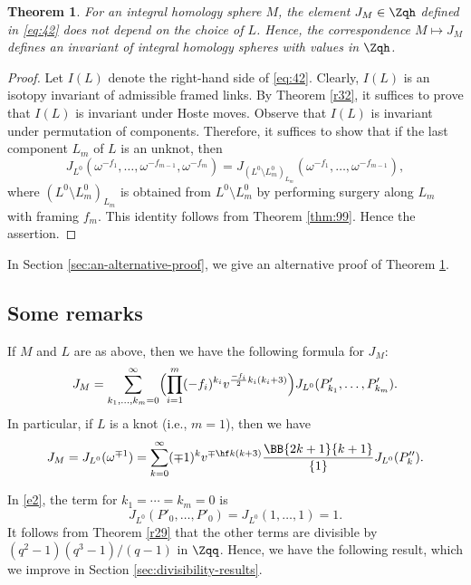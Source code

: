 \documentclass{amsart}
\numberwithin{equation}{section}
\numberwithin{figure}{section}
\theoremstyle{plain}
\newtheorem{theorem}{Theorem}[section]
\theoremstyle{definition}
\theoremstyle{remark}
\begin{document}
\begin{theorem}
  \label{thm:41}
  For an integral homology sphere $M$, the element $J_M\in \Zqh$ defined
  in \eqref{eq:42} does not depend on the choice of $L$.  Hence, the
  correspondence $M\mapsto J_M$ defines an invariant of integral
  homology spheres with values in $\Zqh$.
\end{theorem}

\begin{proof}
  Let $I(L)$ denote the right-hand side of \eqref{eq:42}.  Clearly,
  $I(L)$ is an isotopy invariant of admissible framed links.  By
  Theorem \ref{r32}, it suffices to prove that $I(L)$ is invariant
  under Hoste moves.  Observe that $I(L)$ is invariant under
  permutation of components.  Therefore, it suffices to show that if the
  last component $L_m$ of $L$ is an unknot, then
  \begin{equation*}
    J_{L^0}(\omega ^{-f_1},\ldots,\omega ^{-f_{m-1}},\omega ^{-f_m})
    =J_{(L^0\setminus L^0_m)_{L_m}}(\omega ^{-f_1},\ldots,\omega ^{-f_{m-1}}),
  \end{equation*}
  where $(L^0\setminus L^0_m)_{L_m}$ is obtained from $L^0\setminus L^0_m$ by
  performing surgery along $L_m$ with framing $f_m$.  This identity
  follows from Theorem \ref{thm:99}.  Hence the assertion.
\end{proof}

In Section \ref{sec:an-alternative-proof}, we give an alternative
proof of Theorem \ref{thm:41}.

\subsection{Some remarks}
\label{sec:some-remarks}

If $M$ and $L$ are as above, then we have the following formula for $J_M$:
\begin{equation}
  \label{e2}
  J_M
  = \sum_{k_1,\ldots,k_m=0}^\infty 
  \Bigl(\prod_{i=1}^m(-f_i)^{k_i}v^{\frac{-f_i}{2} k_i(k_i+3)}\Bigr)
  J_{L^0}(P'_{k_1},\ldots,P'_{k_m}).
\end{equation}
In particular, if $L$ is a knot (i.e., $m=1$), then we have
\begin{equation}
  \label{eq:132}
    J_M
    = J_{L^0}(\omega ^{\mp1})
    = \sum_{k=0}^\infty (\mp1)^kv^{\mp\hf k(k+3)}
    \frac{\BB{2k+1}{k+1} }{\{1\}} J_{L^0}(P''_k).
\end{equation}

In \eqref{e2}, the term for $k_1=\cdots=k_m=0$ is
\begin{equation*}
  J_{L^0}(P'_0,\ldots,P'_0)=J_{L^0}(1,\ldots,1)=1.
\end{equation*}
It follows from Theorem \ref{r29} that the other terms are divisible
by $(q^2-1)(q^3-1)/(q-1)$ in $\Zqq$.  Hence, we have the following
result, which we improve in Section \ref{sec:divisibility-results}.
\end{document}
